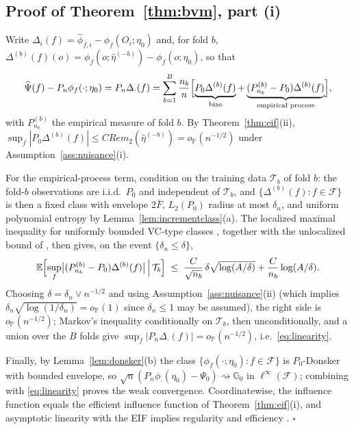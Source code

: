 \documentclass[11pt]{article}
\newcommand{\E}{\mathbb E}
\newcommand{\Pp}{\mathbb P}
\newcommand{\G}{\mathbb G}
\newcommand{\opro}{o_{\Pp}}
\newcommand{\dto}{\rightsquigarrow}
\newcommand{\calF}{\mathcal F}
\newcommand{\calT}{\mathcal T}
\newcommand{\hateta}{\widehat\eta}
\newcommand{\hPsi}{\widehat\Psi}
\newcommand{\hphi}{\widehat\phi}
\begin{document}
\subsection{Proof of Theorem~\ref{thm:bvm}, part (i)}\label{app:onestep}

Write $\Delta_i(f)=\hphi_{f,i}-\phi_f(O_i;\eta_0)$ and, for fold $b$, $\Delta^{(b)}(f)(o)=\phi_f(o;\hateta^{(-b)})-\phi_f(o;\eta_0)$, so that
\begin{equation}\label{eq:foldsplit}
\hPsi(f)-P_n\phi_f(\cdot;\eta_0)
=P_n\Delta_\cdot(f)
=\sum_{b=1}^B\frac{n_b}{n}\Bigl[\underbrace{P_0\Delta^{(b)}(f)}_{\text{bias}}
+\underbrace{(P_{n_b}^{(b)}-P_0)\Delta^{(b)}(f)}_{\text{empirical process}}\Bigr],
\end{equation}
with $P_{n_b}^{(b)}$ the empirical measure of fold $b$. By Theorem~\ref{thm:eif}(ii), $\sup_f|P_0\Delta^{(b)}(f)|\le CRem_2(\hateta^{(-b)})=\opro(n^{-1/2})$ under Assumption~\ref{ass:nuisance}(i).

For the empirical-process term, condition on the training data $\calT_b$ of fold $b$: the fold-$b$ observations are i.i.d.\ $P_0$ and independent of $\calT_b$, and $\{\Delta^{(b)}(f):f\in\calF\}$ is then a fixed class with envelope $2\bar F$, $L_2(P_0)$ radius at most $\delta_n$, and uniform polynomial entropy by Lemma~\ref{lem:incrementclass}\textup{(a)}. The localized maximal inequality for uniformly bounded VC-type classes \citep{vdvwellner2011}, together with the unlocalized bound of \cite[Theorem~2.14.1]{vdvwellner1996}, then gives, on the event $\{\delta_n\le\delta\}$,
\begin{equation}\label{eq:epbound}
\E\Bigl[\sup_{f}\bigl|(P_{n_b}^{(b)}-P_0)\Delta^{(b)}(f)\bigr|\,\Big|\,\calT_b\Bigr]
\;\le\;\frac{C}{\sqrt{n_b}}\,\delta\sqrt{\log(A/\delta)}+\frac{C}{n_b}\log(A/\delta).
\end{equation}
Choosing $\delta=\delta_n\vee n^{-1/2}$ and using Assumption~\ref{ass:nuisance}(ii) (which implies $\delta_n\sqrt{\log(1/\delta_n)}=\opro(1)$ since $\delta_n\le1$ may be assumed), the right side is $\opro(n^{-1/2})$; Markov's inequality conditionally on $\calT_b$, then unconditionally, and a union over the $B$ folds give $\sup_f|P_n\Delta_\cdot(f)|=\opro(n^{-1/2})$, i.e.\ \eqref{eq:linearity}.

Finally, by Lemma~\ref{lem:donsker}(b) the class $\{\phi_f(\cdot;\eta_0):f\in\calF\}$ is $P_0$-Donsker with bounded envelope, so $\sqrt n(P_n\phi_\cdot(\eta_0)-\Psi_0)\dto\G_0$ in $\ell^\infty(\calF)$; combining with \eqref{eq:linearity} proves the weak convergence. Coordinatewise, the influence function equals the efficient influence function of Theorem~\ref{thm:eif}(i), and asymptotic linearity with the EIF implies regularity and efficiency \citep[Section~25.3]{vandervaart1998}. \hfill$\square$
\end{document}
